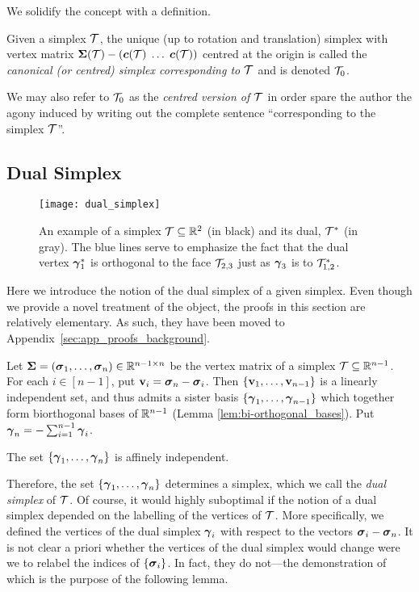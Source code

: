 We solidify the concept with a definition. 

\begin{definition}
	\label{def:centred_simplex}
	Given a simplex $\mathcal{T}$, the unique (up to rotation and translation) simplex with vertex matrix $\boldsymbol{\Sigma}(\mathcal{T}) - (\vb*{c}(\mathcal{T})\;\dots\;\vb*{c}(\mathcal{T}))$ centred at the origin is called the \emph{canonical (or centred) simplex corresponding to $\mathcal{T}$} and is denoted $\mathcal{T}_0$. 
\end{definition}

We may also refer to $\mathcal{T}_0$ as the \emph{centred version of $\mathcal{T}$} in order  spare  the author the agony induced by writing out the complete  sentence ``corresponding to the simplex $\mathcal{T}$''. 

 

\subsection{Dual Simplex}
\label{sec:background_dual_simplex}

\begin{figure}
	\centering
	\texttt{[image: dual\_simplex]}
	\caption{An example of a simplex $\mathcal{T}\subseteq\mathbb{R}^2$ (in black) and its dual, $\mathcal{T}^*$  (in gray).  The blue lines serve to emphasize the  fact that the dual vertex $\vb*{\gamma}_1^*$ is orthogonal to the face $\mathcal{T}_{2,3}$ just as $\vb*{\gamma}_3$ is to $\mathcal{T}^*_{1,2}$. }
	\label{fig:dual_simplex}
\end{figure}
Here we introduce the notion of the dual simplex of a given simplex. Even  though we provide a novel treatment  of  the object, the proofs in this section   are  relatively elementary. As such, they have been moved to Appendix~\ref{sec:app_proofs_background}. 

Let $\boldsymbol{\Sigma}=(\vb*{\sigma}_1,\dots,\vb*{\sigma}_n)\in\mathbb{R}^{n-1\times n}$ be the vertex matrix of a simplex $\mathcal{T}\subseteq\mathbb{R}^{n-1}$. For each $i\in[n-1]$, put $\vb{v}_i=\vb*{\sigma}_n-\vb*{\sigma}_i$. Then $\{\vb{v}_1,\dots,\vb{v}_{n-1}\}$ is a linearly independent set, and thus admits a sister basis $\{\vb*{\gamma}_1,\dots,\vb*{\gamma}_{n-1}\}$ which together form biorthogonal bases of $\mathbb{R}^{n-1}$ (Lemma \ref{lem:bi-orthogonal_bases}). Put $\vb*{\gamma}_n = -\sum_{i=1}^{n-1}\vb*{\gamma}_i$.  

\begin{claim}
	\label{claim:affine_independence}
The set 
$\{\vb*{\gamma}_1,\dots,\vb*{\gamma}_n\}$ is affinely independent. 
\end{claim}

Therefore, the set $\{\vb*{\gamma}_1,\dots,\vb*{\gamma}_n\}$ determines a simplex, which we call the \emph{dual simplex} of $\mathcal{T}$. Of course, it would highly suboptimal if the notion of a dual simplex depended on the labelling of the vertices of $\mathcal{T}$. More specifically, we defined the vertices of the dual simplex $\vb*{\gamma}_i$ with respect to the vectors $\vb*{\sigma}_i-\vb*{\sigma}_n$. It is not clear a priori whether the vertices of the dual simplex would change were we to relabel the indices of $\{\vb*{\sigma}_i\}$. In fact, they do not---the demonstration of which is the purpose of the following lemma. 

